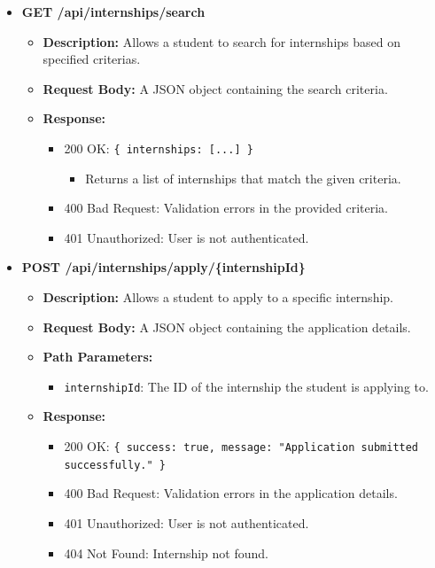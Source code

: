 \begin{itemize}
    \item \textbf{GET /api/internships/search}  
    \begin{itemize}
        \item \textbf{Description:} Allows a student to search for internships based on specified criterias.
        \item \textbf{Request Body:} A JSON object containing the search criteria.
        \item \textbf{Response:}
        \begin{itemize}
            \item 200 OK: \texttt{\{ internships: [...] \}}
            \begin{itemize}
                \item Returns a list of internships that match the given criteria.
            \end{itemize}
            \item 400 Bad Request: Validation errors in the provided criteria.
            \item 401 Unauthorized: User is not authenticated.
        \end{itemize}
    \end{itemize}


    \item \textbf{POST /api/internships/apply/\{internshipId\}}  
    \begin{itemize}
        \item \textbf{Description:} Allows a student to apply to a specific internship.
        \item \textbf{Request Body:} A JSON object containing the application details.
        \item \textbf{Path Parameters:}  
        \begin{itemize}
            \item \texttt{internshipId}: The ID of the internship the student is applying to.
        \end{itemize}
        \item \textbf{Response:}
        \begin{itemize}
            \item 200 OK: \texttt{\{ success: true, message: "Application submitted successfully." \}}
            \item 400 Bad Request: Validation errors in the application details.
            \item 401 Unauthorized: User is not authenticated.
            \item 404 Not Found: Internship not found.
        \end{itemize}
    \end{itemize}



\end{itemize}
